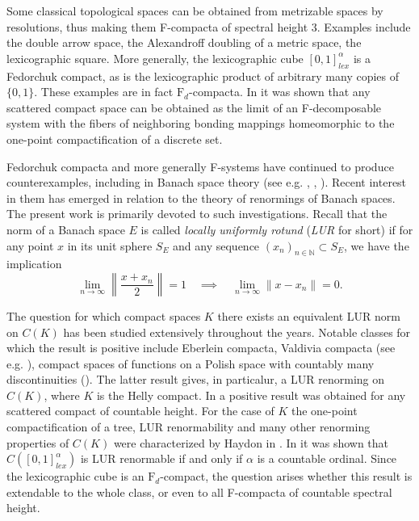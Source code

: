 \documentclass[11pt]{article}
\newcommand{\N}{\mathbb{N}}
\theoremstyle{definition}
\theoremstyle{remark}
\begin{document}
Some classical topological spaces can be obtained from metrizable spaces by resolutions, thus making them F-compacta of spectral height 3. Examples include the double arrow space, the Alexandroff doubling of a metric space, the lexicographic square. More generally, the lexicographic cube $[0,1]^\alpha_{lex}$ is a Fedorchuk compact, as is the lexicographic product of arbitrary many copies of $\{0,1\}$. These examples are in fact $\mathrm{F}_d$-compacta. In \cite{manev24} it was shown that any scattered compact space can be obtained as the limit of an F-decomposable system with the fibers of neighboring bonding mappings homeomorphic to the one-point compactification of a discrete set.

Fedorchuk compacta and more generally F-systems have continued to produce counterexamples, including in Banach space theory (see e.g. \cite{av_kosz}, \cite{kosz-few_op}, \cite{mirna_pleb}). Recent interest in them has emerged in relation to the theory of renormings of Banach spaces. The present work is primarily devoted to such investigations. Recall that the norm of a Banach space $E$ is called \emph{locally uniformly rotund} (\emph{LUR} for short) if for any point $x$ in its unit sphere $S_E$ and any sequence $(x_n)_{n \in \N} \subset S_E$, we have the implication
\begin{equation*}
	\lim_{n \to \infty}\left\|\frac{x + x_n}{2}\right\| = 1 \quad \implies \quad \lim_{n \to \infty}\|x - x_n\| = 0.
\end{equation*}

The question for which compact spaces $K$ there exists an equivalent LUR norm on $C(K)$ has been studied extensively throughout the years. Notable classes for which the result is positive include Eberlein compacta, Valdivia compacta (see e.g. \cite[Section VII.7]{dgz}), compact spaces of functions on a Polish space with countably many discontinuities (\cite{hmo-count.disc}). The latter result gives, in particalur, a LUR renorming on $C(K)$, where $K$ is the Helly compact. In \cite{hay-rog_scattered} a positive result was obtained for any scattered compact of countable height. For the case of $K$ the one-point compactification of a tree, LUR renormability and many other renorming properties of $C(K)$ were characterized by Haydon in \cite{haydon_trees}. In \cite{hjnr00} it was shown that $C([0,1]^\alpha_{lex})$ is LUR renormable if and only if $\alpha$ is a countable ordinal. Since the lexicographic cube is an $\mathrm{F}_d$-compact, the question arises whether this result is extendable to the whole class, or even to all F-compacta of countable spectral height.
\end{document}

